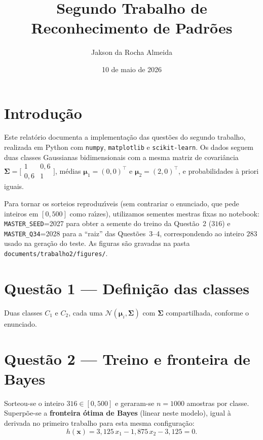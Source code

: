 \documentclass[12pt,a4paper]{article}
\title{Segundo Trabalho de Reconhecimento de Padr\~oes}
\author{Jakson da Rocha Almeida}
\date{10 de maio de 2026}
\begin{document}
\maketitle

\section*{Introdu\c{c}\~ao}

Este relat\'orio documenta a implementa\c{c}\~ao das quest\~oes do segundo trabalho, realizada em Python com \texttt{numpy}, \texttt{matplotlib} e \texttt{scikit-learn}. Os dados seguem duas classes Gaussianas bidimensionais com a mesma matriz de covari\^ancia
$\boldsymbol{\Sigma}=\bigl[\begin{smallmatrix}1&0{,}6\\0{,}6&1\end{smallmatrix}\bigr]$,
m\'edias $\boldsymbol{\mu}_1=(0,0)^\top$ e $\boldsymbol{\mu}_2=(2,0)^\top$, e probabilidades \`a priori iguais.

Para tornar os sorteios reproduz\'{\i}veis (sem contrariar o enunciado, que pede inteiros em $[0,500]$ como ra\'{\i}zes), utilizamos sementes mestras fixas no notebook:
\texttt{MASTER\_SEED}=2027 para obter a semente do treino da Quest\~ao~2 ($316$)
e \texttt{MASTER\_Q34}=2028 para a ``raiz'' das Quest\~oes~3--4, correspondendo ao inteiro $283$ usado na gera\c{c}\~ao do teste.
As figuras s\~ao gravadas na pasta \texttt{documents/\allowbreak trabalho2/\allowbreak figures/}.

\section*{Quest\~ao 1 --- Defini\c{c}\~ao das classes}

Duas classes $C_1$ e $C_2$, cada uma $\mathcal{N}(\boldsymbol{\mu}_i,\boldsymbol{\Sigma})$ com $\boldsymbol{\Sigma}$ compartilhada, conforme o enunciado.

\section*{Quest\~ao 2 --- Treino e fronteira de Bayes}

Sorteou-se o inteiro $316 \in [0,500]$ e geraram-se $n=1000$ amostras por classe.
Superp\~oe-se a \textbf{fronteira \'otima de Bayes} (linear neste modelo), igual \`a derivada no primeiro trabalho para esta mesma configura\c{c}\~ao:
\[
h(\mathbf{x}) = 3{,}125\,x_1 - 1{,}875\,x_2 - 3{,}125 = 0.
\]
\end{document}
